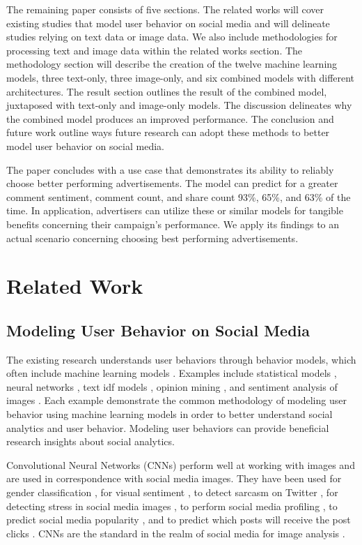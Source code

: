 \documentclass[mksc,blindrev]{informs3} %
\begin{document}
The remaining paper consists of five sections. The related works will cover existing studies that model user behavior on social media and will delineate studies relying on text data or image data. We also include methodologies for processing text and image data within the related works section. The methodology section will describe the creation of the twelve machine learning models, three text-only, three image-only, and six combined models with different architectures. The result section outlines the result of the combined model, juxtaposed with text-only and image-only models. The discussion delineates why the combined model produces an improved performance. The conclusion and future work outline ways future research can adopt these methods to better model user behavior on social media.

The paper concludes with a use case that demonstrates its ability to reliably choose better performing advertisements. The model can predict for a greater comment sentiment, comment count, and share count 93\%, 65\%, and 63\% of the time. In application, advertisers can utilize these or similar models for tangible benefits concerning their campaign's performance. We apply its findings to an actual scenario concerning choosing best performing advertisements.

\section{Related Work}

\subsection{Modeling User Behavior on Social Media}

The existing research understands user behaviors through behavior models, which often include machine learning models \cite{Li2015, 8029313, Ohsawa2013, Liu2012, Li2015}.  Examples include statistical models \cite{Li2015}, neural networks \cite{8029313}, text idf models \cite{Ohsawa2013}, opinion mining \cite{Liu2012}, and sentiment analysis of images \cite{Wang2015}. Each  example demonstrate the common methodology of modeling user behavior using machine learning models in order to better understand social analytics and user behavior. Modeling user behaviors can provide beneficial research insights about social analytics.

Convolutional Neural Networks (CNNs) perform well at working with images and are used in correspondence with social media images. They have been used for gender classification \cite{Hassner2015}, for visual sentiment \cite{Segalin2017, Xu2014}, to detect sarcasm on Twitter \cite{Poria2016}, for detecting stress in social media images \cite{Lin2014}, to perform social media profiling \cite{Segalin2017}, to predict social media popularity \cite{Gelli2015}, and to predict which posts will receive the post clicks \cite{Khosla2014}. CNNs are the standard in the realm of social media for image analysis \cite{Hassner2015}. 
\end{document}
